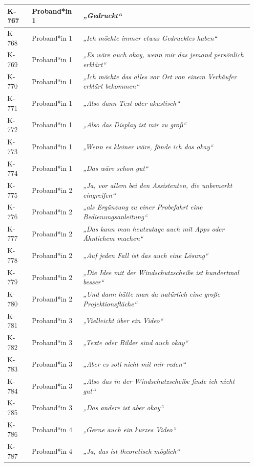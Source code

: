 {\begin{xltabular}{\textwidth}{
    |P{0.10\textwidth}
    |P{0.17\textwidth}
    |Y|
}
K-767 & Proband*in 1 & \textit{„Gedruckt“} \\
\hline
K-768 & Proband*in 1 & \textit{„Ich möchte immer etwas Gedrucktes haben“} \\
\hline
K-769 & Proband*in 1 & \textit{„Es wäre auch okay, wenn mir das jemand persönlich erklärt“} \\
\hline
K-770 & Proband*in 1 & \textit{„Ich möchte das alles vor Ort von einem Verkäufer erklärt bekommen“} \\
\hline
K-771 & Proband*in 1 & \textit{„Also dann Text oder akustisch“} \\
\hline
K-772 & Proband*in 1 & \textit{„Also das Display ist mir zu groß“} \\
\hline
K-773 & Proband*in 1 & \textit{„Wenn es kleiner wäre, fände ich das okay“} \\
\hline
K-774 & Proband*in 1 & \textit{„Das wäre schon gut“} \\
\hline
K-775 & Proband*in 2 & \textit{„Ja, vor allem bei den Assistenten, die unbemerkt eingreifen“} \\
\hline
K-776 & Proband*in 2 & \textit{„als Ergänzung zu einer Probefahrt eine Bedienungsanleitung“} \\
\hline
K-777 & Proband*in 2 & \textit{„Das kann man heutzutage auch mit Apps oder Ähnlichem machen“} \\
\hline
K-778 & Proband*in 2 & \textit{„Auf jeden Fall ist das auch eine Lösung“} \\
\hline
K-779 & Proband*in 2 & \textit{„Die Idee mit der Windschutzscheibe ist hundertmal besser“} \\
\hline
K-780 & Proband*in 2 & \textit{„Und dann hätte man da natürlich eine große Projektionsfläche“} \\
\hline
K-781 & Proband*in 3 & \textit{„Vielleicht über ein Video“} \\
\hline
K-782 & Proband*in 3 & \textit{„Texte oder Bilder sind auch okay“} \\
\hline
K-783 & Proband*in 3 & \textit{„Aber es soll nicht mit mir reden“} \\
\hline
K-784 & Proband*in 3 & \textit{„Also das in der Windschutzscheibe finde ich nicht gut“} \\
\hline
K-785 & Proband*in 3 & \textit{„Das andere ist aber okay“} \\
\hline
K-786 & Proband*in 4 & \textit{„Gerne auch ein kurzes Video“} \\
\hline
K-787 & Proband*in 4 & \textit{„Ja, das ist theoretisch möglich“} \\

\end{xltabular}}
